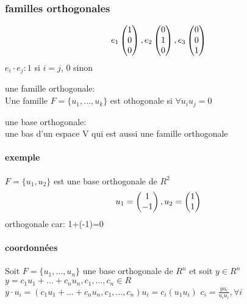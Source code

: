\documentclass[a4paper,10pt]{article}
\begin{document}
\subsubsection{familles orthogonales}
\[e_1
\begin{pmatrix}
 1\cr
 0\cr
 0\cr
\end{pmatrix}, e_2
\begin{pmatrix}
 0\cr
 1\cr
 0\cr
\end{pmatrix}, e_3
\begin{pmatrix}
 0\cr
 0\cr
 1\cr
\end{pmatrix}
\]
\newline
$e_i\cdot e_j:1$ si $i=j$, 0 sinon
\begin{description}
 \item une famille orthogonale:\\{Une famille $F=\{u_1,...,u_k\}$ est othogonale si $\forall u_iu_j=0$}
 \item une base orthogonale:\\{une bas d'un espace V qui est aussi une famille orthogonale}
 \end{description}
\paragraph{exemple}
$F=\{u_1,u_2\}$ est une base orthogonale de $R^2$
\newline
\[
u_1=
\begin{pmatrix}
 1\cr
 -1\cr
\end{pmatrix}
,u_2=
\begin{pmatrix}
 1\cr
 1\cr
\end{pmatrix}
\]
\newline
orthogonale car: 1+(-1)=0
\paragraph{coordonnées}
Soit $F=\{u_1,...,u_n\}$ une base orthogonale de $R^n$ et soit $y\in R^n$
\newline
$y=c_1u_1+...+c_nu_n,c_1,...,c_n\in R$
\newline
$y\cdot u_i=(c_1u_1+...+c_nu_n,c_1,...,c_n)u_i=c_i(u_1u_i)$
\newline
$c_i=\frac{yu_i}{u_iu_i},\forall i$
\end{document}
